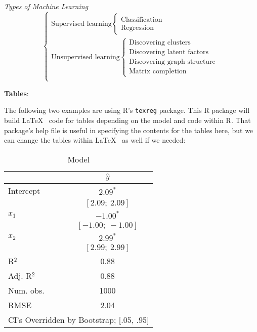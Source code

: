 \documentclass[12pt]{article}
\begin{document}
\textit{Types of Machine Learning} 
\begin{equation}\nonumber 
\begin{cases}
\text{Supervised learning} \begin{cases} \text{Classification} \\ \text{Regression} \end{cases}\\
\text{Unsupervised learning} \begin{cases} \text{Discovering clusters} \\ \text{Discovering latent factors} \\ \text{Discovering graph structure} \\ \text{Matrix completion} \end{cases}\\
\end{cases}
\end{equation}




\clearpage
\textbf{Tables}:

The following two examples are using R's \texttt{texreg} package. This R package will build \LaTeX~ code for tables depending on the model and code within R. That package's help file is useful in specifying the contents for the tables here, but we can change the tables within \LaTeX~ as well if we needed:

\begin{table}[h!]
\caption{Model}
\begin{center}
\begin{tabular}{l c }             %
\hline                            %
           & $\hat{y}$         \\ %
\hline
Intercept  & $2.09^{*}$        \\
           & $[2.09;\ 2.09]$   \\
$x_1$      & $-1.00^{*}$       \\
           & $[-1.00;\ -1.00]$ \\
$x_2$      & $2.99^{*}$        \\
           & $[2.99;\ 2.99]$   \\
\hline
R$^2$      & 0.88              \\
Adj. R$^2$ & 0.88              \\
Num. obs.  & 1000              \\
RMSE       & 2.04              \\
\hline
\multicolumn{2}{l}{\scriptsize{CI's Overridden by Bootstrap; [.05, .95]}}
\end{tabular}
\label{table:coefficients} 
\end{center}
\end{table}
\end{document}
